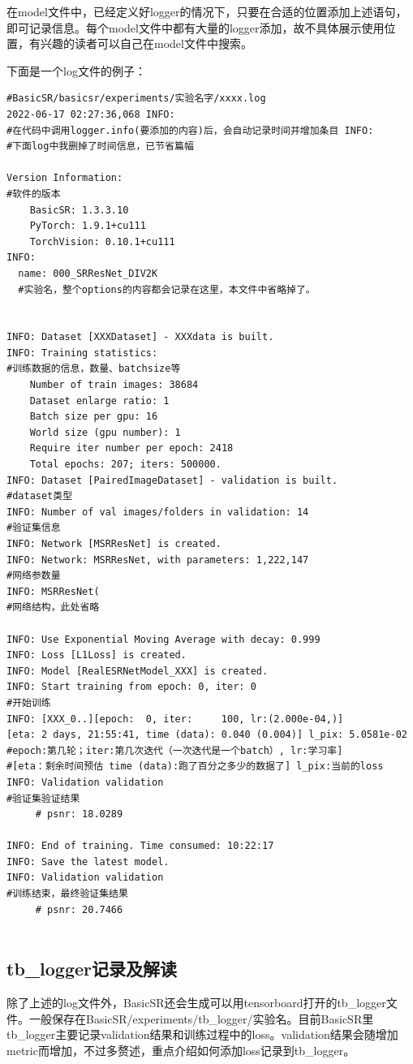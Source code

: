 \documentclass[../main.tex]{subfiles}
\begin{document}
在model文件中，已经定义好logger的情况下，只要在合适的位置添加上述语句，即可记录信息。每个model文件中都有大量的logger添加，故不具体展示使用位置，有兴趣的读者可以自己在model文件中搜索。

下面是一个log文件的例子：

\begin{verbatim}
#BasicSR/basicsr/experiments/实验名字/xxxx.log
2022-06-17 02:27:36,068 INFO: 
#在代码中调用logger.info(要添加的内容)后，会自动记录时间并增加条目 INFO:
#下面log中我删掉了时间信息，已节省篇幅

Version Information: 
#软件的版本
	BasicSR: 1.3.3.10
	PyTorch: 1.9.1+cu111
	TorchVision: 0.10.1+cu111
INFO: 
  name: 000_SRResNet_DIV2K
  #实验名，整个options的内容都会记录在这里，本文件中省略掉了。
  

INFO: Dataset [XXXDataset] - XXXdata is built.
INFO: Training statistics:
#训练数据的信息，数量、batchsize等
	Number of train images: 38684
	Dataset enlarge ratio: 1
	Batch size per gpu: 16
	World size (gpu number): 1
	Require iter number per epoch: 2418
	Total epochs: 207; iters: 500000.
INFO: Dataset [PairedImageDataset] - validation is built.
#dataset类型
INFO: Number of val images/folders in validation: 14
#验证集信息
INFO: Network [MSRResNet] is created.
INFO: Network: MSRResNet, with parameters: 1,222,147
#网络参数量
INFO: MSRResNet(
#网络结构，此处省略
  
INFO: Use Exponential Moving Average with decay: 0.999
INFO: Loss [L1Loss] is created.
INFO: Model [RealESRNetModel_XXX] is created.
INFO: Start training from epoch: 0, iter: 0
#开始训练
INFO: [XXX_0..][epoch:  0, iter:     100, lr:(2.000e-04,)] 
[eta: 2 days, 21:55:41, time (data): 0.040 (0.004)] l_pix: 5.0581e-02 
#epoch:第几轮；iter:第几次迭代（一次迭代是一个batch）, lr:学习率]
#[eta：剩余时间预估 time (data):跑了百分之多少的数据了] l_pix:当前的loss 
INFO: Validation validation
#验证集验证结果
	 # psnr: 18.0289
	 
INFO: End of training. Time consumed: 10:22:17
INFO: Save the latest model.
INFO: Validation validation
#训练结束，最终验证集结果
	 # psnr: 20.7466
	 
\end{verbatim}

\subsection{tb\_logger记录及解读}

除了上述的log文件外，BasicSR还会生成可以用tensorboard打开的tb\_logger文件。一般保存在BasicSR/experiments/tb\_logger/实验名。目前BasicSR里tb\_logger主要记录validation结果和训练过程中的loss。validation结果会随增加metric而增加，不过多赘述，重点介绍如何添加loss记录到tb\_logger。
\end{document}
